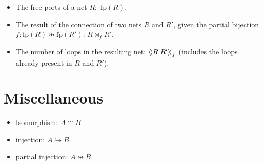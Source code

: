 \begin{itemize}
\item The free ports of a net $R$:~$\mathrm{fp}(R)$.
\item The result of the connection of two nets
  $R$ and
  $R'$, given
  the partial bijection
  $f:\mathrm{fp}(R)\pinj
  \mathrm{fp}(R')$:
  $R\bowtie_f
  R'$.
\item The number of loops in the resulting net:
  $\left\langle\!\left\langle R\middle|R'\right\rangle\!\right\rangle_f$
  (includes the loops already present in
  $R$ and
  $R'$).
\end{itemize}

\section{Miscellaneous}\label{miscellaneous}

\begin{itemize}
\item \hyperref[isomorphism]{Isomorphism}: $A\cong B$
\item injection: $A\hookrightarrow B$
\item partial injection: $A\pinj B$
\end{itemize}

